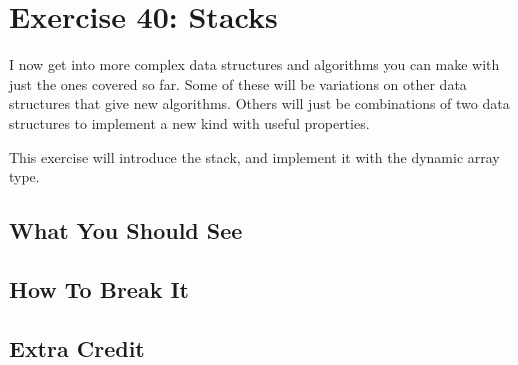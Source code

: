 \chapter{Exercise 40: Stacks}

I now get into more complex data structures and algorithms you can make with just the ones
covered so far.  Some of these will be variations on other data structures that give new
algorithms.  Others will just be combinations of two data structures to implement a new
kind with useful properties.

This exercise will introduce the stack, and implement it with the dynamic array type.


\section{What You Should See}


\section{How To Break It}


\section{Extra Credit}



